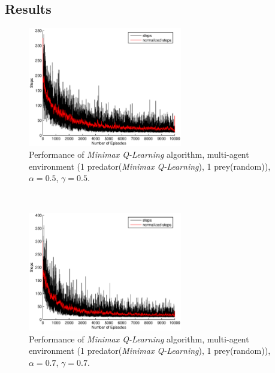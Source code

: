 \documentclass[a4paper,11pt]{article}
\begin{document}
\subsection{Results}

\begin{figure}[ht!]
  \centering
    \includegraphics[width=0.6\textwidth]{figures/minimax0505.eps}
    \caption{Performance of  \textit{Minimax Q-Learning} algorithm, multi-agent environment (1 predator(\textit{Minimax Q-Learning}), 1 prey(random)), $\alpha = 0.5$, $\gamma = 0.5$.}
    \label{m11}
\end{figure}
~
\begin{figure}[ht!]
  \centering
	\includegraphics[width=0.6\textwidth]{figures/minimax0707.eps}
   \caption{Performance of  \textit{Minimax Q-Learning} algorithm, multi-agent environment (1 predator(\textit{Minimax Q-Learning}), 1 prey(random)), $\alpha = 0.7$, $\gamma = 0.7$.}
    \label{m22}
\end{figure}
~
\end{document}
